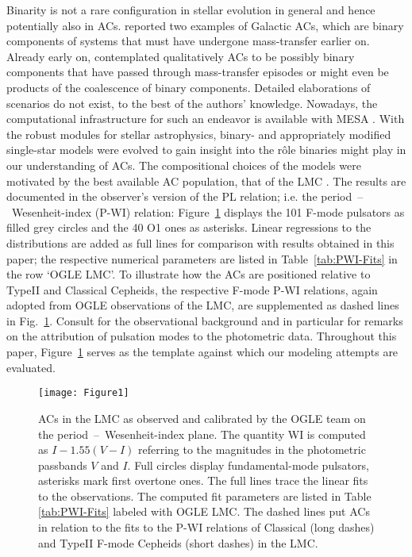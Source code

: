 \documentclass[a4paper,fleqn,usenatbib]{mnras}
\begin{document}
Binarity is not a rare configuration in stellar evolution in general
and hence potentially also in ACs. \citet{Sipahi2013a,Sipahi2013b}
reported two examples of Galactic ACs, which are binary components of
systems that must have undergone mass-transfer earlier on. Already
early on, \citet{Zinn1976} contemplated qualitatively ACs to be
possibly binary components that have passed through mass-transfer
episodes or might even be products of the coalescence of binary
components.  Detailed elaborations of scenarios do not exist, to the
best of the authors' knowledge. Nowadays, the computational
infrastructure for such an endeavor is available with MESA
\citep[cf.][]{Paxton2013,Paxton2015}.  With the robust modules for
stellar astrophysics, binary- and appropriately modified single-star
models were evolved to gain insight into the r{\^o}le binaries might
play in our understanding of ACs. The compositional choices of the
models were motivated by the best available AC population, that of the
LMC \citep{Soszynski2015}.  The results are documented in the
observer's version of the PL relation; i.e. the
period~--~Wesenheit-index (P-WI) relation: Figure~\ref{fig:ACs_LMC}
displays the 101 F-mode pulsators as filled grey circles and the 40 O1
ones as asterisks. Linear regressions to the distributions are added
as full lines for comparison with results obtained in this paper; the
respective numerical parameters are listed in Table~\ref{tab:PWI-Fits}
in the row `OGLE LMC'.  To illustrate how the ACs are positioned
relative to TypeII and Classical Cepheids, the respective F-mode P-WI
relations, again adopted from OGLE observations of the LMC, are
supplemented as dashed lines in Fig.~\ref{fig:ACs_LMC}.  Consult
\citet{Soszynski2015} for the observational background and in
particular for remarks on the attribution of pulsation modes to the
photometric data.  Throughout this paper, Figure~\ref{fig:ACs_LMC}
serves as the template against which our modeling attempts are
evaluated.
 
\begin{figure}
	\texttt{[image: Figure1]}
    \caption{ACs in the LMC as observed and calibrated by the OGLE team
    	     \citep{Soszynski2015} on the period~--~Wesenheit-index plane.
    	     The quantity WI is computed as $I - 1.55\left( V - I \right)$ 
    	     referring to the magnitudes in the photometric passbands $V$ and $I$.  
    	     Full circles display fundamental-mode pulsators, asterisks mark 
    	     first overtone ones. The full lines trace the  
    	     linear fits to the observations. The computed fit 
    	     parameters are listed in Table \ref{tab:PWI-Fits} labeled 
    	     with OGLE LMC. The dashed lines put ACs in relation to 
    	     the fits to the P-WI relations of Classical (long dashes) 
    	     and TypeII F-mode Cepheids (short dashes) in the LMC.
    	    }
    \label{fig:ACs_LMC}
\end{figure} 
\end{document}
